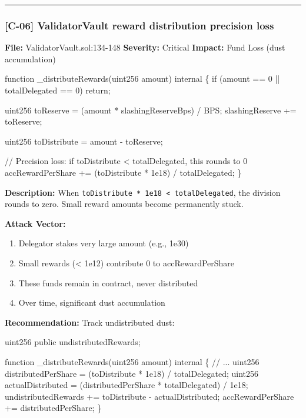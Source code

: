 \documentclass[
]{article}
\newenvironment{Shaded}{}{}
\newcommand{\NormalTok}[1]{#1}
\providecommand{\tightlist}{%
  \setlength{\itemsep}{0pt}\setlength{\parskip}{0pt}}
\begin{document}
\begin{center}\rule{0.5\linewidth}{0.5pt}\end{center}

\subsubsection{{[}C-06{]} ValidatorVault reward distribution precision
loss}\label{c-06-validatorvault-reward-distribution-precision-loss}

\textbf{File:} ValidatorVault.sol:134-148 \textbf{Severity:} Critical
\textbf{Impact:} Fund Loss (dust accumulation)

\begin{Shaded}
\begin{Highlighting}[]
\NormalTok{function \_distributeRewards(uint256 amount) internal \{}
\NormalTok{    if (amount == 0 || totalDelegated == 0) return;}

\NormalTok{    uint256 toReserve = (amount * slashingReserveBps) / BPS;}
\NormalTok{    slashingReserve += toReserve;}

\NormalTok{    uint256 toDistribute = amount {-} toReserve;}

\NormalTok{    // Precision loss: if toDistribute \textless{} totalDelegated, this rounds to 0}
\NormalTok{    accRewardPerShare += (toDistribute * 1e18) / totalDelegated;}
\NormalTok{\}}
\end{Highlighting}
\end{Shaded}

\textbf{Description:} When
\texttt{toDistribute\ *\ 1e18\ \textless{}\ totalDelegated}, the
division rounds to zero. Small reward amounts become permanently stuck.

\textbf{Attack Vector:}

\begin{enumerate}
\def\labelenumi{\arabic{enumi}.}
\tightlist
\item
  Delegator stakes very large amount (e.g., 1e30)
\item
  Small rewards (\textless{} 1e12) contribute 0 to accRewardPerShare
\item
  These funds remain in contract, never distributed
\item
  Over time, significant dust accumulation
\end{enumerate}

\textbf{Recommendation:} Track undistributed dust:

\begin{Shaded}
\begin{Highlighting}[]
\NormalTok{uint256 public undistributedRewards;}

\NormalTok{function \_distributeRewards(uint256 amount) internal \{}
\NormalTok{    // ...}
\NormalTok{    uint256 distributedPerShare = (toDistribute * 1e18) / totalDelegated;}
\NormalTok{    uint256 actualDistributed = (distributedPerShare * totalDelegated) / 1e18;}
\NormalTok{    undistributedRewards += toDistribute {-} actualDistributed;}
\NormalTok{    accRewardPerShare += distributedPerShare;}
\NormalTok{\}}
\end{Highlighting}
\end{Shaded}
\end{document}
